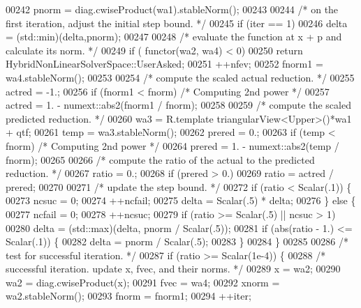 \begin{DoxyCode}
00242         pnorm = diag.cwiseProduct(wa1).stableNorm();
00243 
00244         \textcolor{comment}{/* on the first iteration, adjust the initial step bound. */}
00245         \textcolor{keywordflow}{if} (iter == 1)
00246             delta = (std::min)(delta,pnorm);
00247 
00248         \textcolor{comment}{/* evaluate the function at x + p and calculate its norm. */}
00249         \textcolor{keywordflow}{if} ( functor(wa2, wa4) < 0)
00250             \textcolor{keywordflow}{return} HybridNonLinearSolverSpace::UserAsked;
00251         ++nfev;
00252         fnorm1 = wa4.stableNorm();
00253 
00254         \textcolor{comment}{/* compute the scaled actual reduction. */}
00255         actred = -1.;
00256         \textcolor{keywordflow}{if} (fnorm1 < fnorm) \textcolor{comment}{/* Computing 2nd power */}
00257             actred = 1. - numext::abs2(fnorm1 / fnorm);
00258 
00259         \textcolor{comment}{/* compute the scaled predicted reduction. */}
00260         wa3 = R.template triangularView<Upper>()*wa1 + qtf;
00261         temp = wa3.stableNorm();
00262         prered = 0.;
00263         \textcolor{keywordflow}{if} (temp < fnorm) \textcolor{comment}{/* Computing 2nd power */}
00264             prered = 1. - numext::abs2(temp / fnorm);
00265 
00266         \textcolor{comment}{/* compute the ratio of the actual to the predicted reduction. */}
00267         ratio = 0.;
00268         \textcolor{keywordflow}{if} (prered > 0.)
00269             ratio = actred / prered;
00270 
00271         \textcolor{comment}{/* update the step bound. */}
00272         \textcolor{keywordflow}{if} (ratio < Scalar(.1)) \{
00273             ncsuc = 0;
00274             ++ncfail;
00275             delta = Scalar(.5) * delta;
00276         \} \textcolor{keywordflow}{else} \{
00277             ncfail = 0;
00278             ++ncsuc;
00279             \textcolor{keywordflow}{if} (ratio >= Scalar(.5) || ncsuc > 1)
00280                 delta = (std::max)(delta, pnorm / Scalar(.5));
00281             \textcolor{keywordflow}{if} (abs(ratio - 1.) <= Scalar(.1)) \{
00282                 delta = pnorm / Scalar(.5);
00283             \}
00284         \}
00285 
00286         \textcolor{comment}{/* test for successful iteration. */}
00287         \textcolor{keywordflow}{if} (ratio >= Scalar(1e-4)) \{
00288             \textcolor{comment}{/* successful iteration. update x, fvec, and their norms. */}
00289             x = wa2;
00290             wa2 = diag.cwiseProduct(x);
00291             fvec = wa4;
00292             xnorm = wa2.stableNorm();
00293             fnorm = fnorm1;
00294             ++iter;

\end{DoxyCode}
